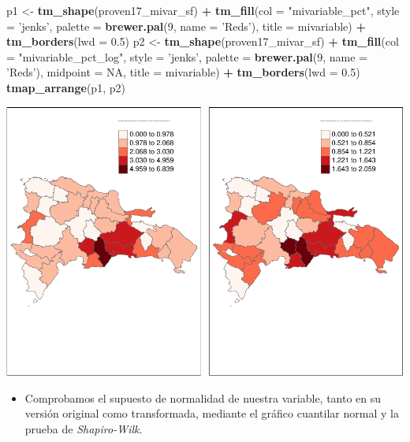 \documentclass[11pt,]{article}
\newenvironment{Shaded}{\begin{snugshade}}{\end{snugshade}}
\newcommand{\KeywordTok}[1]{\textcolor[rgb]{0.13,0.29,0.53}{\textbf{#1}}}
\newcommand{\DataTypeTok}[1]{\textcolor[rgb]{0.13,0.29,0.53}{#1}}
\newcommand{\DecValTok}[1]{\textcolor[rgb]{0.00,0.00,0.81}{#1}}
\newcommand{\FloatTok}[1]{\textcolor[rgb]{0.00,0.00,0.81}{#1}}
\newcommand{\StringTok}[1]{\textcolor[rgb]{0.31,0.60,0.02}{#1}}
\newcommand{\OtherTok}[1]{\textcolor[rgb]{0.56,0.35,0.01}{#1}}
\newcommand{\OperatorTok}[1]{\textcolor[rgb]{0.81,0.36,0.00}{\textbf{#1}}}
\newcommand{\NormalTok}[1]{#1}
\providecommand{\tightlist}{%
\setlength{\itemsep}{0pt}\setlength{\parskip}{0pt}}
\begin{document}
\begin{Shaded}
\begin{Highlighting}[]
\NormalTok{p1 <-}\StringTok{ }\KeywordTok{tm_shape}\NormalTok{(proven17_mivar_sf) }\OperatorTok{+}
\StringTok{  }\KeywordTok{tm_fill}\NormalTok{(}\DataTypeTok{col =} \StringTok{"mivariable_pct"}\NormalTok{, }\DataTypeTok{style =} \StringTok{'jenks'}\NormalTok{,}
          \DataTypeTok{palette =} \KeywordTok{brewer.pal}\NormalTok{(}\DecValTok{9}\NormalTok{, }\DataTypeTok{name =} \StringTok{'Reds'}\NormalTok{), }\DataTypeTok{title =}\NormalTok{ mivariable) }\OperatorTok{+}
\StringTok{  }\KeywordTok{tm_borders}\NormalTok{(}\DataTypeTok{lwd =} \FloatTok{0.5}\NormalTok{)}
\NormalTok{p2 <-}\StringTok{ }\KeywordTok{tm_shape}\NormalTok{(proven17_mivar_sf) }\OperatorTok{+}
\StringTok{  }\KeywordTok{tm_fill}\NormalTok{(}\DataTypeTok{col =} \StringTok{"mivariable_pct_log"}\NormalTok{, }\DataTypeTok{style =} \StringTok{'jenks'}\NormalTok{,}
          \DataTypeTok{palette =} \KeywordTok{brewer.pal}\NormalTok{(}\DecValTok{9}\NormalTok{, }\DataTypeTok{name =} \StringTok{'Reds'}\NormalTok{), }\DataTypeTok{midpoint =} \OtherTok{NA}\NormalTok{, }\DataTypeTok{title =}\NormalTok{ mivariable) }\OperatorTok{+}
\StringTok{  }\KeywordTok{tm_borders}\NormalTok{(}\DataTypeTok{lwd =} \FloatTok{0.5}\NormalTok{) }
\KeywordTok{tmap_arrange}\NormalTok{(p1, p2)}
\end{Highlighting}
\end{Shaded}

\includegraphics{proyecto_files/figure-latex/pctfueramaps-1.pdf}

\begin{itemize}
\tightlist
\item
  Comprobamos el supuesto de normalidad de nuestra variable, tanto en su
  versión original como transformada, mediante el gráfico cuantilar
  normal y la prueba de \emph{Shapiro-Wilk}.
\end{itemize}
\end{document}
